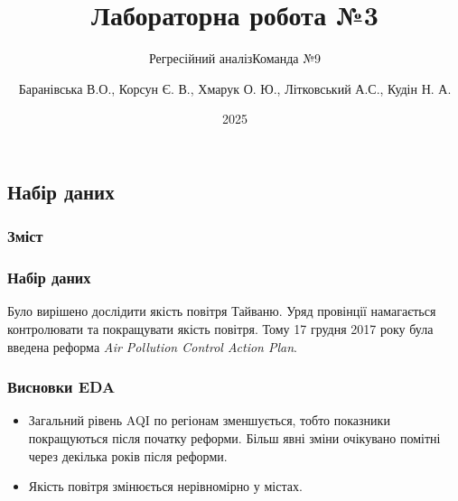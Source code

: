 \documentclass{beamer}
\title{Лабораторна робота №3}
\subtitle{Регресійний аналіз}
\subtitle{Команда №9}
\author[]{
  Баранівська В.О.,
  Корсун Є. В.,
  Хмарук О. Ю.,
  Літковський А.С.,
  Кудін Н. А.
}
\date{2025}
\begin{document}
\frame{\titlepage}

\graphicspath{{../../../}} %


\begin{frame}
  \section{Набір даних}

  \frametitle{Зміст}
  \tableofcontents[currentsection]
\end{frame}

\begin{frame}
  \frametitle{Набір даних}

  Було вирішено дослідити якість повітря Тайваню. Уряд провінції намагається
  контролювати та покращувати якість повітря. Тому 17 грудня 2017 року була введена
  реформа \textit{Air Pollution Control Action Plan}.

  \begin{center}

  \end{center}
\end{frame}

% 
% 
% 

\begin{frame}
  \frametitle{Висновки EDA}
  \begin{itemize}
    \item Загальний рівень AQI по регіонам зменшується, тобто показники покращуються після початку реформи.
    Більш явні зміни очікувано помітні через декілька років після реформи.

    \item Якість повітря змінюється нерівномірно у містах.
  \end{itemize}
\end{frame}
\end{document}
